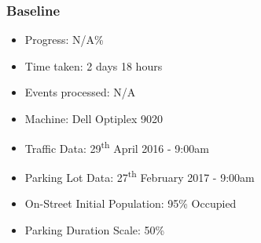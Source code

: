 \subsubsection{Baseline}
\begin{itemize}
    \setlength\itemsep{0em}
    \item Progress: N/A\%
    \item Time taken: 2 days 18 hours
    \item Events processed: N/A
    \item Machine: Dell Optiplex 9020
    \item Traffic Data: 29\textsuperscript{th} April 2016 - 9:00am
    \item Parking Lot Data: 27\textsuperscript{th} February 2017 - 9:00am
    \item On-Street Initial Population: 95\% Occupied
    \item Parking Duration Scale: 50\%
\end{itemize}

